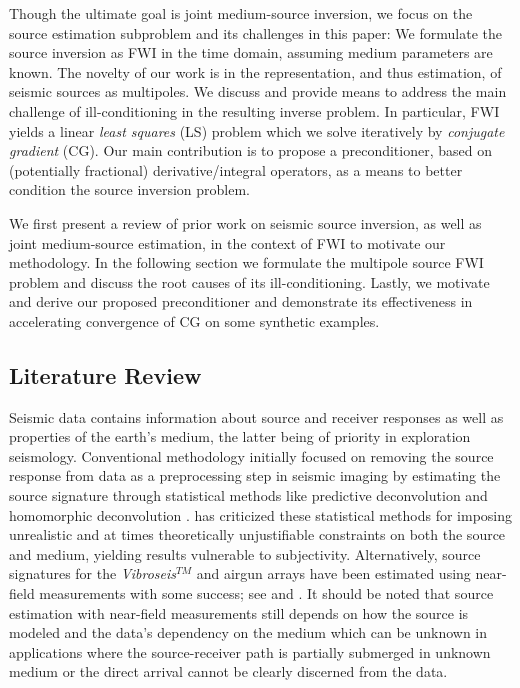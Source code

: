 Though the ultimate goal is joint medium-source inversion, we focus on the source estimation subproblem and its challenges in this paper:
We formulate the source inversion as FWI in the time domain, assuming medium parameters are known.
The novelty of our work is in the representation, and thus estimation, of seismic sources as multipoles.
We discuss and provide means to address the main challenge of ill-conditioning in the resulting inverse problem.
In particular, FWI yields a linear \emph{least squares} (LS) problem which we solve iteratively by \emph{conjugate gradient} (CG).
Our main contribution is to propose a preconditioner, based on (potentially fractional) derivative/integral operators, as a means to better condition the source inversion problem.

We first present a review of prior work on seismic source inversion, as well as joint medium-source estimation, in the context of FWI to motivate our methodology. 
In the following section we formulate the multipole source FWI problem and discuss the root causes of its ill-conditioning.
Lastly, we motivate and derive our proposed preconditioner and demonstrate its effectiveness in accelerating convergence of CG on some synthetic examples.


\subsection{Literature Review}


Seismic data contains information about source and receiver responses as well as properties of the earth's medium, the latter being of priority in exploration seismology. 
Conventional methodology initially focused on removing the source response from data as a preprocessing step in seismic imaging by estimating the source signature through statistical methods like predictive deconvolution \citep{Rob:57} and homomorphic deconvolution \citep{Ulr:71}. 
\cite{Zio:91} has criticized these statistical methods for imposing unrealistic and at times theoretically unjustifiable constraints on both the source and medium, yielding results vulnerable to subjectivity. 
Alternatively, source signatures for the \emph{Vibroseis$^{TM}$} and airgun arrays have been estimated using near-field measurements with some success; see \cite{Zio:91} and \cite{Landro:92}.
It should be noted that source estimation with near-field measurements still depends on how the source is modeled and the data's dependency on the medium which can be unknown in applications where the source-receiver path is partially submerged in unknown medium or the direct arrival cannot be clearly discerned from the data.

